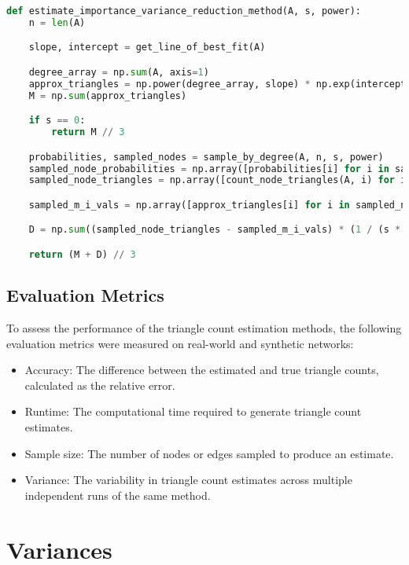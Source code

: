 \documentclass[11pt]{article}
\begin{document}
\begin{lstlisting}[language=Python]
def estimate_importance_variance_reduction_method(A, s, power):
    n = len(A)

    slope, intercept = get_line_of_best_fit(A)

    degree_array = np.sum(A, axis=1)
    approx_triangles = np.power(degree_array, slope) * np.exp(intercept)
    M = np.sum(approx_triangles)

    if s == 0:
        return M // 3

    probabilities, sampled_nodes = sample_by_degree(A, n, s, power)
    sampled_node_probabilities = np.array([probabilities[i] for i in sampled_nodes])
    sampled_node_triangles = np.array([count_node_triangles(A, i) for i in sampled_nodes])

    sampled_m_i_vals = np.array([approx_triangles[i] for i in sampled_nodes])

    D = np.sum((sampled_node_triangles - sampled_m_i_vals) * (1 / (s * sampled_node_probabilities)))

    return (M + D) // 3
\end{lstlisting}

\subsection{Evaluation Metrics}

To assess the performance of the triangle count estimation methods, the following evaluation metrics were measured on real-world and synthetic networks:

\begin{itemize}
\item Accuracy: The difference between the estimated and true triangle counts, calculated as the relative error.
\item Runtime: The computational time required to generate triangle count estimates.
\item Sample size: The number of nodes or edges sampled to produce an estimate.
\item Variance: The variability in triangle count estimates across multiple independent runs of the same method.
\end{itemize}

\newpage

\section{Variances}
\end{document}
